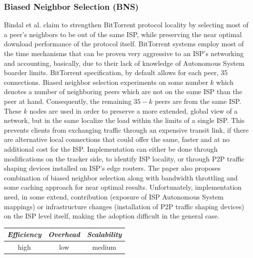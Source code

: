 \subsubsection{Biased Neighbor Selection (BNS)}
Bindal et al. \cite{BCCMSBZ2006} claim to strengthen BitTorrent
protocol\cite{c_bittorrent_2003} locality by selecting most of a peer's
neighbors to be out of the same ISP, while preserving the near optimal download
performance of the protocol itself. BitTorrent systems employ most of the time
mechanisms that can be proven very aggressive to an ISP's networking and
accounting, basically, due to their lack of knowledge of Autonomous System
boarder limits. BitTorrent specification, by default allows for each peer, 35
connections. Biased neighbor selection experiments on some number $k$ which
denotes a number of neighboring peers which are not on the same ISP than the
peer at hand. Consequently, the remaining $35 - k$ peers are from the same ISP.
These $k$ nodes are used in order to preserve a more extended, global view of a
network, but in the same localize the load within the limits of a single ISP.
This prevents clients from exchanging traffic through an expensive transit link,
if there are alternative local connections that could offer the same, faster and
at no additional cost for the ISP. Implementation can either be done through
modifications on the tracker side, to identify ISP locality, or through P2P
traffic shaping devices installed on ISP's edge routers. The paper also proposes
combination of biased neighbor selection along with bandwidth throttling and
some caching approach for near optimal results. Unfortunately, implementation
need, in some extend, contribution (exposure of ISP Autonomous System mappings)
or infrastructure changes (installation of P2P traffic shaping devices) on the
ISP level itself, making the adoption difficult in the general case.

\begin{center}
\begin{tabular}{ccc}
\emph{Efficiency} & \emph{Overhead} & \emph{Scalability} \\
\hline
high &
low &
medium
\end{tabular}
\end{center}

